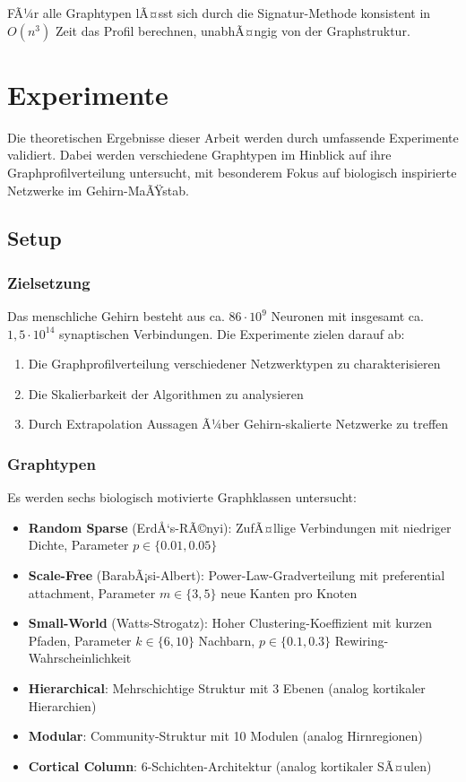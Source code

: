 ﻿\documentclass[a4paper,12pt]{article}
\theoremstyle{definition}
\begin{document}
	FÃ¼r alle Graphtypen lÃ¤sst sich durch die Signatur-Methode konsistent in $O(n^3)$ Zeit das Profil berechnen, unabhÃ¤ngig von der Graphstruktur.
	
	\section{Experimente}
	
	Die theoretischen Ergebnisse dieser Arbeit werden durch umfassende Experimente validiert. Dabei werden verschiedene Graphtypen im Hinblick auf ihre Graphprofilverteilung untersucht, mit besonderem Fokus auf biologisch inspirierte Netzwerke im Gehirn-MaÃŸstab.
	
	\subsection{Setup}
	
	\subsubsection{Zielsetzung}
	
	Das menschliche Gehirn besteht aus ca. $86 \cdot 10^9$ Neuronen mit insgesamt ca. $1{,}5 \cdot 10^{14}$ synaptischen Verbindungen. Die Experimente zielen darauf ab:
	
	\begin{enumerate}
		\item Die Graphprofilverteilung verschiedener Netzwerktypen zu charakterisieren
		\item Die Skalierbarkeit der Algorithmen zu analysieren
		\item Durch Extrapolation Aussagen Ã¼ber Gehirn-skalierte Netzwerke zu treffen
	\end{enumerate}
	
	\subsubsection{Graphtypen}
	
	Es werden sechs biologisch motivierte Graphklassen untersucht:
	
	\begin{itemize}
		\item[-] \textbf{Random Sparse} (ErdÅ‘s-RÃ©nyi): ZufÃ¤llige Verbindungen mit niedriger Dichte, Parameter $p \in \{0.01, 0.05\}$
		\item[-] \textbf{Scale-Free} (BarabÃ¡si-Albert): Power-Law-Gradverteilung mit preferential attachment, Parameter $m \in \{3, 5\}$ neue Kanten pro Knoten
		\item[-] \textbf{Small-World} (Watts-Strogatz): Hoher Clustering-Koeffizient mit kurzen Pfaden, Parameter $k \in \{6, 10\}$ Nachbarn, $p \in \{0.1, 0.3\}$ Rewiring-Wahrscheinlichkeit
		\item[-] \textbf{Hierarchical}: Mehrschichtige Struktur mit 3 Ebenen (analog kortikaler Hierarchien)
		\item[-] \textbf{Modular}: Community-Struktur mit 10 Modulen (analog Hirnregionen)
		\item[-] \textbf{Cortical Column}: 6-Schichten-Architektur (analog kortikaler SÃ¤ulen)
	\end{itemize}
	
\end{document}

